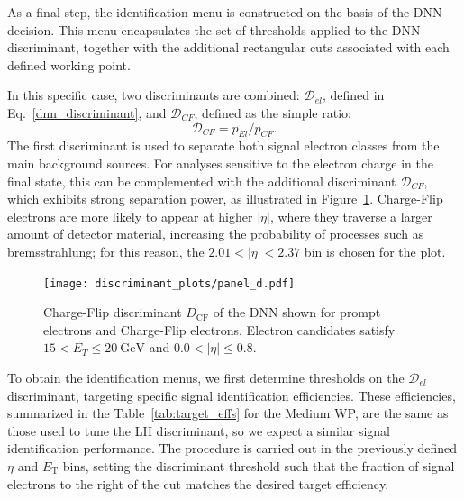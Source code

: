 As a final step, the identification menu is constructed on the basis of the DNN decision. This menu encapsulates the set of thresholds applied to the DNN discriminant, together with the additional rectangular cuts associated with each defined working point.

In this specific case, two discriminants are combined: $\mathcal{D}_{el}$, defined in Eq.~\ref{dnn_discriminant}, and $\mathcal{D}_{CF}$, defined as the simple ratio:
\begin{equation}
  \mathcal{D}_{CF} = p_{El}/p_{CF}.
\label{cf_disc}
\end{equation}
The first discriminant is used to separate both signal electron classes from the main background sources. For analyses sensitive to the electron charge in the final state, this can be complemented with the additional discriminant $\mathcal{D}_{CF}$, which exhibits strong separation power, as illustrated in Figure~\ref{fig:cf_discriminant}. Charge-Flip electrons are more likely to appear at higher $|\eta|$, where they traverse a larger amount of detector material, increasing the probability of processes such as bremsstrahlung; for this reason, the $2.01 < |\eta| < 2.37$ bin is chosen for the plot.

\begin{figure}[htbp]
  \centering
  \texttt{[image: discriminant\_plots/panel\_d.pdf]}
  \caption{Charge-Flip discriminant $D_{\mathrm{CF}}$ of the DNN shown for prompt electrons and
  Charge-Flip electrons. Electron candidates satisfy $15<E_{T}\leq 20~\mathrm{GeV}$ and $0.0<|\eta|\leq 0.8$.}
  \label{fig:cf_discriminant}
\end{figure}

To obtain the identification menus, we first determine thresholds on the $\mathcal{D}_{el}$ discriminant, targeting specific signal identification efficiencies. These efficiencies, summarized in the Table~\ref{tab:target_effs} for the Medium WP, are the same as those used to tune the LH discriminant, so we expect a similar signal identification performance. The procedure is carried out in the previously defined $\eta$ and $E_{\text{T}}$ bins, setting the discriminant threshold such that the fraction of signal electrons to the right of the cut matches the desired target efficiency.

